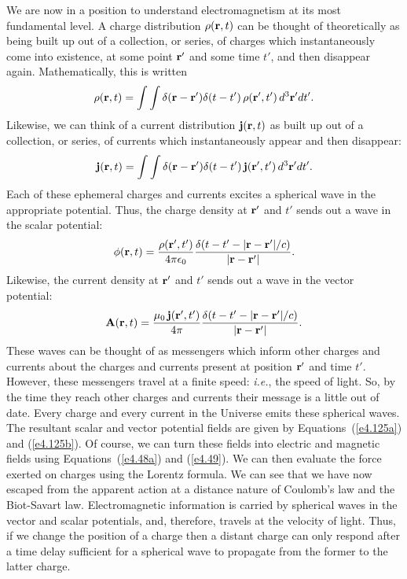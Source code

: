 We are now in a position to understand electromagnetism at its most fundamental level.
A charge distribution $\rho({\bf r}, t)$ can be thought of theoretically as being built up
out of a  collection, or series, of charges which
instantaneously come into existence, at some point ${\bf r}'$ and some time $t'$, and 
then disappear again. Mathematically, this is written
\begin{equation}
\rho({\bf r}, t) = \int\int \delta({\bf r} - {\bf r}') \delta(t-t') \,
\rho({\bf r}', t')\,d^3 {\bf r}' dt'.
\end{equation}
Likewise, we can think of a current distribution ${\bf j}({\bf r}, t)$ as built up
out of a collection, or series, of currents which instantaneously appear and then disappear:
\begin{equation}
{\bf j} ({\bf r}, t) = \int\int \delta({\bf r} - {\bf r}') \delta(t-t') \,
{\bf j} ({\bf r}', t')\,d^3 {\bf r}' dt'.
\end{equation}
Each of these ephemeral charges and currents excites a spherical wave in the appropriate
potential. Thus, the charge density at ${\bf r'}$ and $t'$ sends out a wave in the
scalar potential:
\begin{equation}
\phi({\bf r}, t) = \frac{\rho({\bf r'}, t')}{4\pi\epsilon_0}
\frac{\delta(t-t' - |{\bf r} - {\bf r'}|/c)}{|{\bf r} - {\bf r}'|}.
\end{equation}
Likewise, the current density at ${\bf r}'$ and $t'$ sends out a wave in the vector potential:
\begin{equation}
{\bf A}({\bf r}, t) = \frac{\mu_0\,{\bf j}({\bf r'}, t')}{4\pi }
\frac{\delta(t-t' - |{\bf r} - {\bf r'}|/c)}{|{\bf r} - {\bf r}'|}.
\end{equation}
These waves can be thought of as  messengers which  inform other charges and currents about
the charges and currents present at position ${\bf r}'$ and time $t'$. However,  these
messengers travel at a finite speed: {\em i.e.}, 
the speed of light. So, by the time they reach other charges
and currents their message is a little out of date. Every charge and every current in the Universe
emits these spherical waves. The resultant scalar and vector
potential fields are given by Equations~(\ref{e4.125a}) and (\ref{e4.125b}). Of course, we can turn these fields into
electric and magnetic fields using Equations~(\ref{e4.48a}) and
(\ref{e4.49}). We can then evaluate the force exerted on charges
using the Lorentz formula. We can see that we have now escaped from the apparent action at a distance
nature of Coulomb's law and the Biot-Savart law. Electromagnetic information
is carried by spherical waves in the vector and scalar potentials,  and, therefore,   travels at the
velocity of light. Thus, if we change the position of a charge then a distant charge can only 
 respond after a time delay sufficient for a spherical wave to propagate from the former to
the latter charge. 

